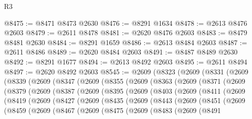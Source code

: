 \begin{lexlean}{R3}
\begin{coremodule}
@8475 := @8471 @8473 @2630
@8476 := @8291 @1634
@8478 := @2613 @8476 @2603
@8479 := @2611 @8478
@8481 := @2620 @8476 @2603
@8483 := @8479 @8481 @2630
@8484 := @8291 @1659
@8486 := @2613 @8484 @2603
@8487 := @2611 @8486
@8489 := @2620 @8484 @2603
@8491 := @8487 @8489 @2630
@8492 := @8291 @1677
@8494 := @2613 @8492 @2603
@8495 := @2611 @8494
@8497 := @2620 @8492 @2603
@8545 := @2609
    (@8323
      (@2609
        (@8331
          (@2609
            (@8339
              (@2609
                (@8347
                  (@2609
                    (@8355
                      (@2609
                        (@8363
                          (@2609
                            (@8371
                              (@2609
                                (@8379
                                  (@2609
                                    (@8387
                                      (@2609
                                        (@8395
                                          (@2609
                                            (@8403
                                              (@2609
                                                (@8411
                                                  (@2609
                                                    (@8419
                                                      (@2609
                                                        (@8427
                                                          (@2609
                                                            (@8435
                                                              (@2609
                                                                (@8443
                                                                  (@2609
                                                                    (@8451
                                                                      (@2609
                                                                        (@8459
                                                                          (@2609
                                                                            (@8467
                                                                              (@2609
                                                                                (@8475
                                                                                  (@2609
                                                                                    (@8483
                                                                                      (@2609
                                                                                        (@8491

\end{coremodule}
\end{lexlean}

